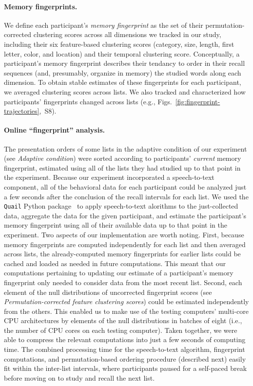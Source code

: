 \documentclass[11pt]{article}
\newcommand{\fingerprintTrajectoryRandom}{S8}
\begin{document}
\paragraph*{Memory fingerprints.}

We define each participant's \textit{memory fingerprint} as the set of their
permutation-corrected clustering scores across all dimensions we tracked in our
study, including their six feature-based clustering scores (category, size,
length, first letter, color, and location) and their temporal clustering score.
Conceptually, a participant's memory fingerprint describes their tendancy to
order in their recall sequences (and, presumably, organize in memory) the
studied words along each dimension. To obtain stable estimates of these
fingerprints for each participant, we averaged clustering scores across lists.
We also tracked and characterized how participants' fingerprints changed across
lists (e.g.,
Figs.~\ref{fig:fingerprint-trajectories},~\fingerprintTrajectoryRandom).

\paragraph{Online ``fingerprint'' analysis.}

The presentation orders of some lists in the adaptive condition of our
experiment (see \textit{Adaptive condition}) were sorted according to
participants' \textit{current} memory fingerprint, estimated using all of the
lists they had studied up to that point in the experiment. Because our
experiment incorporated a speech-to-text component, all of the behavioral data
for each participant could be analyzed just a few seconds after the conclusion
of the recall intervals for each list. We used the \texttt{Quail} Python
package~\citep{HeusEtal17} to apply speech-to-text alorithms to the
just-collected data, aggregate the data for the given participant, and estimate
the participant's memory fingerprint using all of their available data up to
that point in the experiment. Two aspects of our implementation are worth
noting. First, because memory fingerprints are computed independently for each
list and then averaged across lists, the already-computed memory fingerprints
for earlier lists could be cached and loaded as needed in future computations.
This meant that our computations pertaining to updating our estimate of a
participant's memory fingerprint only needed to consider data from the most
recent list. Second, each element of the null distributions of uncorrected
fingerprint scores (see \textit{Permutation-corrected feature clustering
scores}) could be estimated independently from the others. This enabled us to
make use of the testing computers' multi-core CPU architectures by elements of
the null distributions in batches of eight (i.e., the number of CPU cores on
each testing computer). Taken together, we were able to compress the relevant
computations into just a few seconds of computing time. The combined processing
time for the speech-to-text algorithm, fingerprint computations, and
permutation-based ordering procedure (described next) easily fit within the
inter-list intervals, where participants paused for a self-paced break before
moving on to study and recall the next list.
\end{document}
